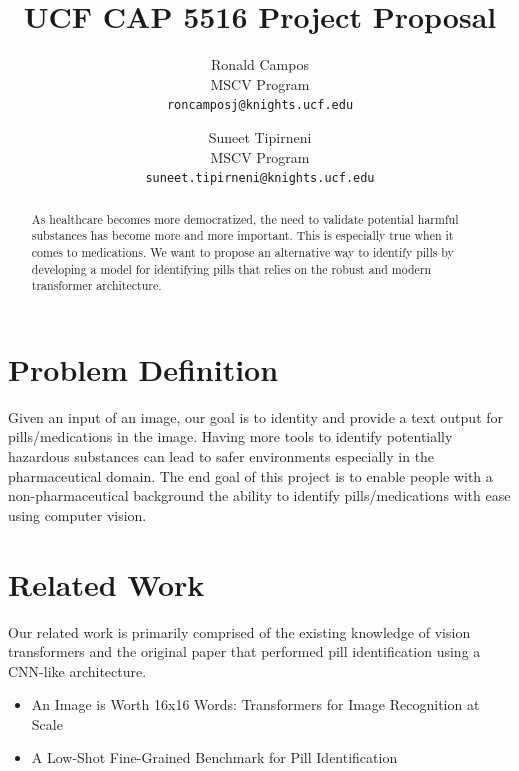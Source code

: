 \documentclass[10pt,twocolumn,letterpaper]{article}
\begin{document}
\title{UCF CAP 5516 Project Proposal}

\author{Ronald Campos\\
MSCV Program\\
{\tt\small roncamposj@knights.ucf.edu}
\and
Suneet Tipirneni\\
MSCV Program\\
{\tt\small  suneet.tipirneni@knights.ucf.edu}
}

\maketitle
\ificcvfinal\thispagestyle{empty}\fi


\begin{abstract}
    As healthcare becomes more democratized, the need to validate potential harmful substances has become more and more important. This is especially true when it comes to medications. We want to propose an alternative way to identify pills by developing
    a model for identifying pills that relies on the robust and modern transformer architecture.
\end{abstract}


\section{Problem Definition}
Given an input of an image, our goal is to identity and provide a text output for pills/medications in the image. Having more tools to identify potentially hazardous substances can lead to safer environments especially in the pharmaceutical domain. The end goal of this project is to enable people with a non-pharmaceutical background the ability to identify pills/medications with ease using computer vision.

\section{Related Work}

Our related work is primarily comprised of the existing knowledge of vision transformers and the original paper
that performed pill identification using a CNN-like architecture.
\begin{itemize}
    \item An Image is Worth 16x16 Words: Transformers for Image Recognition at Scale~\cite{an_imageworth}
        \item A Low-Shot Fine-Grained Benchmark for Pill Identification~\cite{ePill}
\end{itemize}
\end{document}
